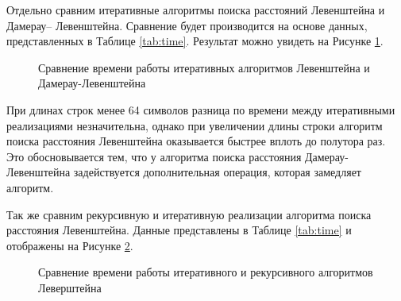    Отдельно сравним итеративные алгоритмы поиска расстояний Левенштейна и Дамерау– Левенштейна. Сравнение будет производится на основе данных, представленных в Таблице \ref{tab:time}. Результат можно увидеть на Рисунке \ref{plt:time_cmp_l_dl}. 
        
    \begin{figure}[!h]
      \centering
      \captionsetup{justification=centering}
      \caption{Сравнение времени работы итеративных алгоритмов Левенштейна и Дамерау-Левенштейна}
      \label{plt:time_cmp_l_dl}
    \end{figure}
    
    При длинах строк менее 64 символов разница по времени между итеративными реализациями незначительна, однако при увеличении длины строки алгоритм поиска расстояния Левенштейна оказывается быстрее вплоть до полутора раз. Это обосновывается тем, что у алгоритма поиска расстояния Дамерау-Левенштейна задействуется дополнительная операция, которая замедляет алгоритм.
    
    Так же сравним рекурсивную и итеративную реализации алгоритма поиска расстояния Левенштейна. Данные представлены в Таблице \ref{tab:time} и отображены на Рисунке \ref{plt:time_cmp_rec_iter}.
   
    \begin{figure}[!h!]
      \centering
      \captionsetup{justification=centering}
      \caption{Сравнение времени работы итеративного и рекурсивного алгоритмов Леверштейна}
      \label{plt:time_cmp_rec_iter}
    \end{figure}
    
